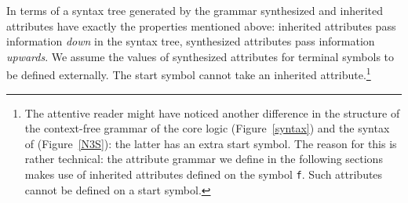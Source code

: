 
In terms of a syntax tree generated by the grammar synthesized and inherited attributes have exactly the properties mentioned above:  
inherited attributes pass information \emph{down} in the syntax tree, synthesized attributes pass information \emph{upwards}.
We assume the values of synthesized attributes for terminal symbols to be defined externally. The start symbol cannot take an inherited attribute.\footnote{The attentive
reader might have noticed another difference in the structure of the context-free grammar of the core logic (Figure~\ref{syntax}) and the syntax of \nthree (Figure~\ref{N3S}):
the latter has an extra start symbol. The reason for this is rather technical: the attribute grammar we define in the following sections makes use of inherited attributes
defined on the symbol \texttt{f}. Such attributes cannot be defined on a start symbol.
} 


